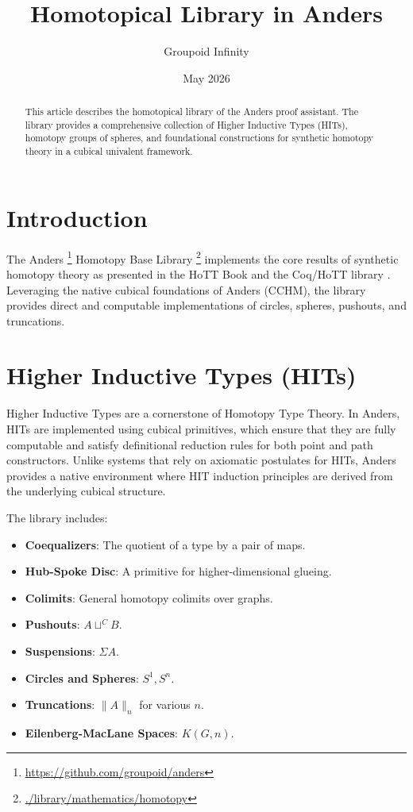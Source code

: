 \documentclass[11pt]{article}
\title{Homotopical Library in Anders}
\author{Groupoid Infinity}
\date{May 2026}
\begin{document}
\maketitle

\begin{abstract}
This article describes the homotopical library of the Anders proof assistant.
The library provides a comprehensive collection of Higher Inductive Types (HITs),
homotopy groups of spheres, and foundational constructions for synthetic homotopy theory
in a cubical univalent framework.
\end{abstract}

\newpage
\tableofcontents

\newpage
\section{Introduction}

The Anders \footnote{\url{https://github.com/groupoid/anders}} Homotopy Base Library
\footnote{\url{./library/mathematics/homotopy}} implements the core results of synthetic
homotopy theory as presented in the HoTT Book \cite{hottbook} and the Coq/HoTT library \cite{bauer2016}. Leveraging the native
cubical foundations of Anders (CCHM), the library provides direct and computable
implementations of circles, spheres, pushouts, and truncations.

\section{Higher Inductive Types (HITs)}

Higher Inductive Types are a cornerstone of Homotopy Type Theory. In Anders, HITs are implemented
using cubical primitives, which ensure that they are fully computable and satisfy definitional
reduction rules for both point and path constructors. Unlike systems that rely on axiomatic
postulates for HITs, Anders provides a native environment where HIT induction principles
are derived from the underlying cubical structure.

The library includes:
\begin{itemize}
    \item \textbf{Coequalizers}: The quotient of a type by a pair of maps.
    \item \textbf{Hub-Spoke Disc}: A primitive for higher-dimensional glueing.
    \item \textbf{Colimits}: General homotopy colimits over graphs.
    \item \textbf{Pushouts}: $A \sqcup^C B$.
    \item \textbf{Suspensions}: $\Sigma A$.
    \item \textbf{Circles and Spheres}: $S^1, S^n$.
    \item \textbf{Truncations}: $\| A \|_n$ for various $n$.
    \item \textbf{Eilenberg-MacLane Spaces}: $K(G, n)$.
\end{itemize}
\end{document}
